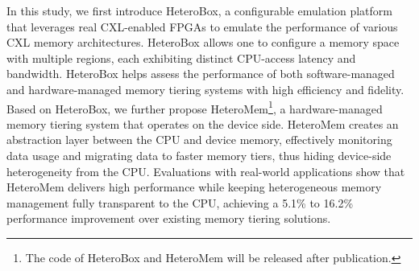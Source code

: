 In this study, we first introduce HeteroBox, a configurable emulation platform that leverages real CXL-enabled FPGAs to emulate the performance of various CXL memory architectures. HeteroBox allows one to configure a memory space with multiple regions, each exhibiting distinct CPU-access latency and bandwidth.  HeteroBox helps assess the performance of both software-managed and hardware-managed memory tiering systems with high efficiency and fidelity. Based on HeteroBox, we further propose HeteroMem\footnote{The code of HeteroBox and HeteroMem will be released after publication.}, a hardware-managed memory tiering system that operates on the device side. HeteroMem creates an abstraction layer between the CPU and device memory, effectively monitoring data usage and migrating data to faster memory tiers, thus hiding device-side heterogeneity from the CPU. 
Evaluations with real-world applications show that HeteroMem delivers high performance while keeping heterogeneous memory management fully transparent to the CPU, achieving a 5.1\% to 16.2\% performance improvement over existing memory tiering solutions. 






